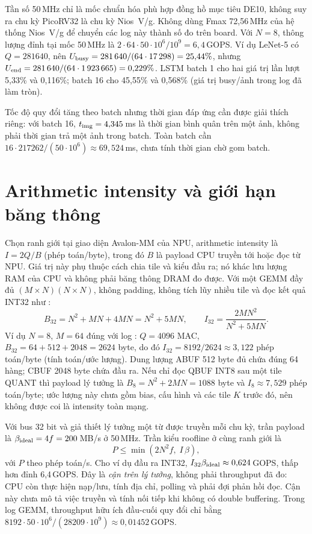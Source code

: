 Tần số 50\,MHz chỉ là mốc chuẩn hóa phù hợp đồng hồ mục tiêu DE10, không suy ra chu kỳ PicoRV32 là chu kỳ Nios~V/g. Không dùng Fmax 72,56\,MHz của hệ thống Nios~V/g để chuyển các log này thành số đo trên board. Với $N=8$, thông lượng đỉnh tại mốc 50\,MHz là $2\cdot64\cdot50\cdot10^6/10^9=6{,}4$\,GOPS. Ví dụ LeNet-5 có $Q=\num{281640}$, nên $U_{\rm busy}=\num{281640}/(64\cdot\num{17298})=25{,}44\%$, nhưng $U_{\rm end}=\num{281640}/(64\cdot\num{1923665})=0{,}229\%$. LSTM batch 1 cho hai giá trị lần lượt 5,33\% và 0,116\%; batch 16 cho 45,55\% và 0,568\% (giá trị busy/ảnh trong log đã làm tròn).

Tốc độ quy đổi tăng theo batch nhưng thời gian đáp ứng cần được giải thích riêng: với batch 16, $t_{\rm img}=4{,}345$\,ms là thời gian bình quân trên một ảnh, không phải thời gian trả một ảnh trong batch. Toàn batch cần $16\cdot\num{217262}/(50\cdot10^6)\approx69{,}524$\,ms, chưa tính thời gian chờ gom batch.

\section{Arithmetic intensity và giới hạn băng thông}
\label{sec:arithmetic-intensity}
Chọn ranh giới tại giao diện Avalon-MM của NPU, arithmetic intensity là $I=2Q/B$ (phép toán/byte), trong đó $B$ là payload CPU truyền tới hoặc đọc từ NPU. Giá trị này phụ thuộc cách chia tile và kiểu đầu ra; nó khác lưu lượng RAM của CPU và không phải băng thông DRAM đo được. Với một GEMM đầy đủ $(M\times N)(N\times N)$, không padding, không tích lũy nhiều tile và đọc kết quả INT32 như :
\begin{equation}
 B_{32}=N^2+MN+4MN=N^2+5MN,\qquad
 I_{32}=\frac{2MN^2}{N^2+5MN}.
\end{equation}
Ví dụ $N=8$, $M=64$ đúng với log : $Q=4096$ MAC, $B_{32}=64+512+2048=2624$ byte, do đó $I_{32}=8192/2624\approx3{,}122$ phép toán/byte (tính toán/ước lượng). Dung lượng ABUF 512 byte đủ chứa đúng 64 hàng; CBUF 2048 byte chứa đầu ra. Nếu chỉ đọc QBUF INT8 sau một tile QUANT thì payload lý tưởng là $B_8=N^2+2MN=1088$ byte và $I_8\approx7{,}529$ phép toán/byte; ước lượng này chưa gồm bias, cấu hình và các tile $K$ trước đó, nên không được coi là intensity toàn mạng.

Với bus 32 bit và giả thiết lý tưởng một từ được truyền mỗi chu kỳ, trần payload là $\beta_{\rm ideal}=4f=200$\,MB/s ở 50\,MHz. Trần kiểu roofline ở cùng ranh giới là
\begin{equation}
 P\le\min\!\left(2N^2f,\;I\,\beta\right),
\end{equation}
với $P$ theo phép toán/s. Cho ví dụ đầu ra INT32, $I_{32}\beta_{\rm ideal}\approx0{,}624$\,GOPS, thấp hơn đỉnh 6,4\,GOPS. Đây là \emph{cận trên lý tưởng}, không phải throughput đã đo: CPU còn thực hiện nạp/lưu, tính địa chỉ, polling và phải đợi phản hồi đọc. Cận này chưa mô tả việc truyền và tính nối tiếp khi không có double buffering. Trong log GEMM, throughput hữu ích đầu-cuối quy đổi chỉ bằng $8192\cdot50\cdot10^6/(\num{28209}\cdot10^9)\approx0{,}01452$\,GOPS.

